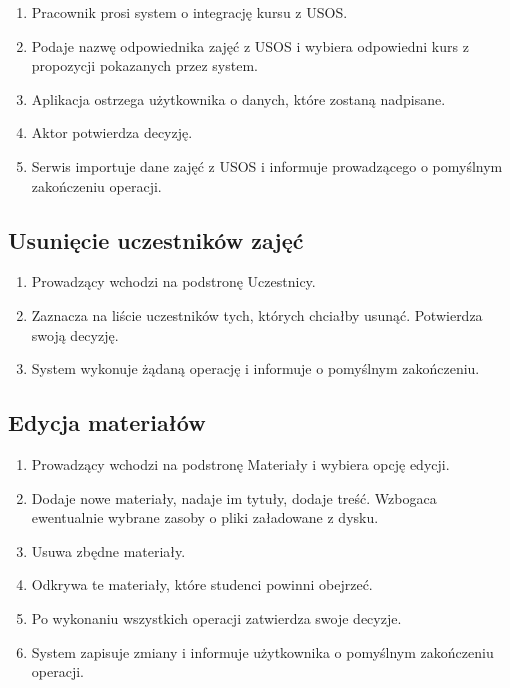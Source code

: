 \documentclass{pracamgr}
\begin{document}
\begin{enumerate}
   \item Pracownik prosi system o integrację kursu z USOS.
   \item Podaje nazwę odpowiednika zajęć z USOS i wybiera odpowiedni
      kurs z propozycji pokazanych przez system.
   \item Aplikacja ostrzega użytkownika o danych, które zostaną nadpisane.
   \item Aktor potwierdza decyzję.
   \item Serwis importuje dane zajęć z USOS i informuje prowadzącego
      o pomyślnym zakończeniu operacji.
\end{enumerate}

\subsection{Usunięcie uczestników zajęć}

\begin{enumerate}
   \item Prowadzący wchodzi na podstronę Uczestnicy.
   \item Zaznacza na liście uczestników tych, których chciałby usunąć.
      Potwierdza swoją decyzję.
   \item System wykonuje żądaną operację i informuje o pomyślnym zakończeniu.
\end{enumerate}

\subsection{Edycja materiałów}

\begin{enumerate}
   \item Prowadzący wchodzi na podstronę Materiały i wybiera opcję 
      edycji.
   \item Dodaje nowe materiały, nadaje im tytuły, dodaje treść. Wzbogaca
      ewentualnie wybrane zasoby o pliki załadowane z dysku.
   \item Usuwa zbędne materiały.
   \item Odkrywa te materiały, które studenci powinni obejrzeć.
   \item Po wykonaniu wszystkich operacji zatwierdza swoje decyzje.
   \item System zapisuje zmiany i informuje użytkownika o pomyślnym zakończeniu
      operacji.
\end{enumerate} 
\end{document}

